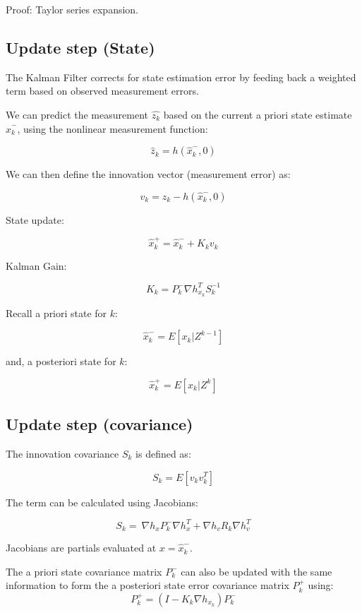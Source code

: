 \documentclass[11pt]{article}
\begin{document}
Proof: Taylor series expansion.



\subsection{Update step (State)}

The Kalman Filter corrects for state estimation error by feeding back a weighted term based on 
observed measurement errors.

We can predict the measurement $\hat{z_k}$ based on the current a priori state estimate $\hat{x}^-_k$,
using the nonlinear measurement function:

\[ \hat{z}_k = h(\hat{x}^-_k, 0) \]

We can then define the innovation vector (measurement error) as:

\[ v_k = z_k -  h(\hat{x}^-_k, 0) \]

State update:

\[ \hat{x}^+_k = \hat{x}^-_k + K_k v_k \] 


Kalman Gain:

\[ K_k = P_k^- \nabla h_{x_k}^T S_k^{-1} \] 

Recall a priori state for $k$:

\[  \hat{x}^-_k = E[x_k | Z^{k-1}] \]

and, a posteriori state for $k$:

\[  \hat{x}^+_k = E[x_k | Z^{k}] \]
\subsection{Update step (covariance)}


The innovation covariance $S_k$ is defined as:

\[ S_k = E[v_k v_k^T] \]


The term can be calculated using Jacobians:

\[ S_k = \
\nabla h_x P_k^- \nabla h_x^T + \nabla h_v R_k \nabla h_v^T \]

 Jacobians are partials evaluated at $x = \hat{x}_k^-$.

 The a priori state covariance matrix $P_k^-$ can also be updated with the same information to form 
 the a posteriori state error covariance matrix $P_k^+$ using:
 \[ P_k^+ = (I - K_k \nabla h_{x_k}) P_k^- \]
\end{document}

